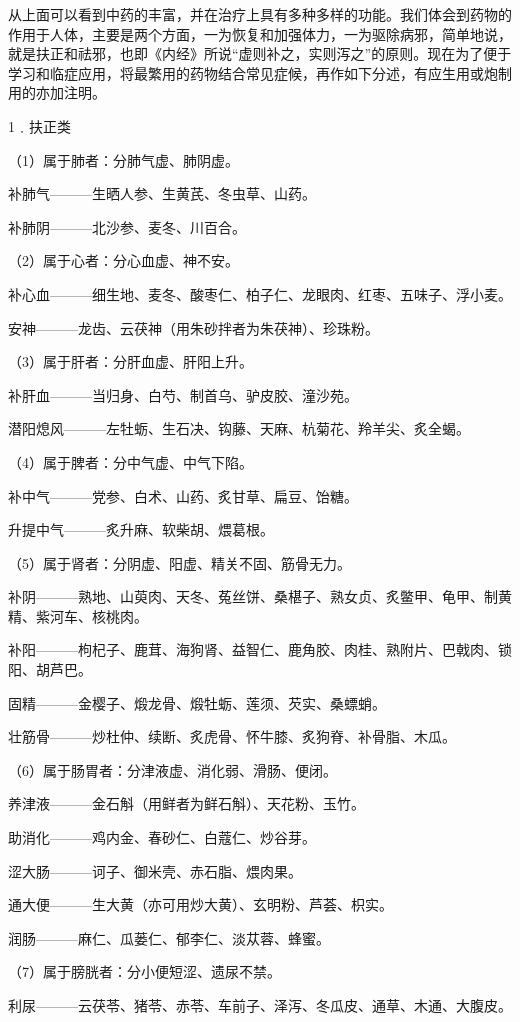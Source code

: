 \documentclass[a4paper,12pt,UTF8,twoside]{ctexbook}
\begin{document}
从上面可以看到中药的丰富，并在治疗上具有多种多样的功能。我们体会到药物的作用于人体，主要是两个方面，一为恢复和加强体力，一为驱除病邪，简单地说，就是扶正和祛邪，也即《内经》所说“虚则补之，实则泻之”的原则。现在为了便于学习和临症应用，将最繁用的药物结合常见症候，再作如下分述，有应生用或炮制用的亦加注明。

1﹒扶正类

（1）属于肺者：分肺气虚、肺阴虚。

补肺气———生晒人参、生黄芪、冬虫草、山药。

补肺阴———北沙参、麦冬、川百合。

（2）属于心者：分心血虚、神不安。

补心血———细生地、麦冬、酸枣仁、柏子仁、龙眼肉、红枣、五味子、浮小麦。

安神———龙齿、云茯神（用朱砂拌者为朱茯神）、珍珠粉。

（3）属于肝者：分肝血虚、肝阳上升。

补肝血———当归身、白芍、制首乌、驴皮胶、潼沙苑。

潜阳熄风———左牡蛎、生石决、钩藤、天麻、杭菊花、羚羊尖、炙全蝎。

（4）属于脾者：分中气虚、中气下陷。

补中气———党参、白术、山药、炙甘草、扁豆、饴糖。

升提中气———炙升麻、软柴胡、煨葛根。

（5）属于肾者：分阴虚、阳虚、精关不固、筋骨无力。

补阴———熟地、山萸肉、天冬、菟丝饼、桑椹子、熟女贞、炙鳖甲、龟甲、制黄精、紫河车、核桃肉。

补阳———枸杞子、鹿茸、海狗肾、益智仁、鹿角胶、肉桂、熟附片、巴戟肉、锁阳、胡芦巴。

固精———金樱子、煅龙骨、煅牡蛎、莲须、芡实、桑螵蛸。

壮筋骨———炒杜仲、续断、炙虎骨、怀牛膝、炙狗脊、补骨脂、木瓜。

（6）属于肠胃者：分津液虚、消化弱、滑肠、便闭。

养津液———金石斛（用鲜者为鲜石斛）、天花粉、玉竹。

助消化———鸡内金、春砂仁、白蔻仁、炒谷芽。

涩大肠———诃子、御米壳、赤石脂、煨肉果。

通大便———生大黄（亦可用炒大黄）、玄明粉、芦荟、枳实。

润肠———麻仁、瓜蒌仁、郁李仁、淡苁蓉、蜂蜜。

（7）属于膀胱者：分小便短涩、遗尿不禁。

利尿———云茯苓、猪苓、赤苓、车前子、泽泻、冬瓜皮、通草、木通、大腹皮。
\end{document}

